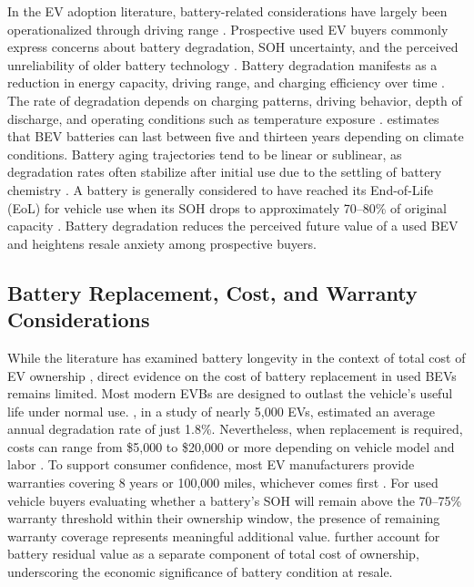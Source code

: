 \documentclass[a4paper,fleqn]{cas-sc}   %
\begin{document}
In the EV adoption literature, battery-related considerations have largely been operationalized through driving range \parencite{yuanInvestigationRangeAnxiety2018}. Prospective used EV buyers commonly express concerns about battery degradation, SOH uncertainty, and the perceived unreliability of older battery technology \parencite{pedrosaSecondhandElectricalVehicles2018}. Battery degradation manifests as a reduction in energy capacity, driving range, and charging efficiency over time \parencite{attiaReviewKneesLithiumIonBattery2022}. The rate of degradation depends on charging patterns, driving behavior, depth of discharge, and operating conditions such as temperature exposure \parencite{bashashPluginHybridElectric2011, neubauerSensitivityBatteryElectric2012}. \textcite{yangPredictiveModelingBattery2018} estimates that BEV batteries can last between five and thirteen years depending on climate conditions. Battery aging trajectories tend to be linear or sublinear, as degradation rates often stabilize after initial use due to the settling of battery chemistry \parencite{attiaRevisitingT05Dependence2020, attiaReviewKneesLithiumIonBattery2022}. A battery is generally considered to have reached its End-of-Life (EoL) for vehicle use when its SOH drops to approximately 70--80\% of original capacity \parencite{canalscasalsEvaluationEndofLifeElectric2019, canalscasalsElectricVehicleBattery2022}. Battery degradation reduces the perceived future value of a used BEV and heightens resale anxiety among prospective buyers.

\subsection{Battery Replacement, Cost, and Warranty Considerations}

While the literature has examined battery longevity in the context of total cost of EV ownership \parencite{hagmanTotalCostOwnership2016, letmatheConsumerorientedTotalCost2017}, direct evidence on the cost of battery replacement in used BEVs remains limited. Most modern EVBs are designed to outlast the vehicle's useful life under normal use. \textcite{dnistranEVBatteriesCan2024}, in a study of nearly 5,000 EVs, estimated an average annual degradation rate of just 1.8\%. Nevertheless, when replacement is required, costs can range from \$5,000 to \$20,000 or more depending on vehicle model and labor \parencite{kothariBatteryReplacementCosts2024, wittElectricCarBattery2024}. To support consumer confidence, most EV manufacturers provide warranties covering 8 years or 100,000 miles, whichever comes first \parencite{clarkeCarWarrantyCoverage2024}. For used vehicle buyers evaluating whether a battery's SOH will remain above the 70--75\% warranty threshold within their ownership window, the presence of remaining warranty coverage represents meaningful additional value. \textcite{letmatheConsumerorientedTotalCost2017} further account for battery residual value as a separate component of total cost of ownership, underscoring the economic significance of battery condition at resale.
\end{document}

